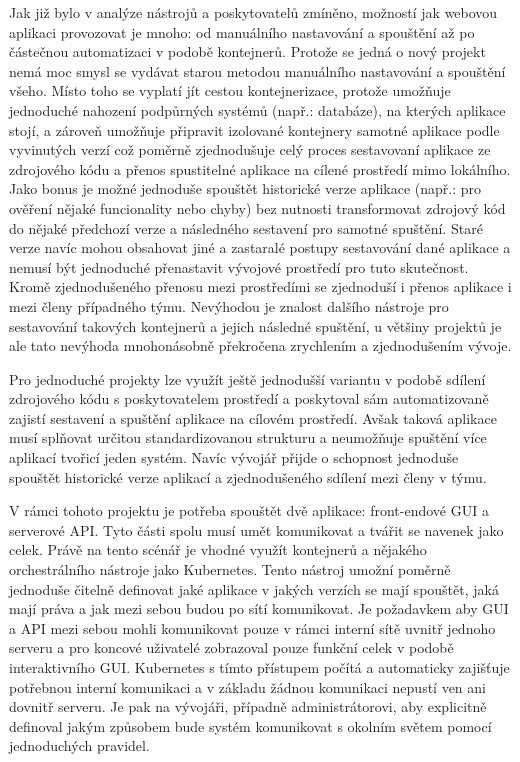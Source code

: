 			Jak již bylo v analýze nástrojů a poskytovatelů zmíněno, možností jak webovou aplikaci provozovat je mnoho: od
			manuálního nastavování a spouštění až po částečnou automatizaci v podobě kontejnerů.
			Protože se jedná o nový projekt nemá moc smysl se vydávat starou metodou manuálního nastavování a spouštění všeho.
			Místo toho se vyplatí jít cestou kontejnerizace, protože umožňuje jednoduché nahození podpůrných systémů
			(např.: databáze), na kterých aplikace stojí, a zároveň umožňuje připravit izolované kontejnery samotné aplikace
			podle vyvinutých verzí což poměrně zjednodušuje celý proces sestavovaní aplikace ze zdrojového kódu a přenos
			spustitelné aplikace na cílené prostředí mimo lokálního.
			Jako bonus je možné jednoduše spouštět historické verze aplikace (např.: pro ověření nějaké funcionality nebo chyby)
			bez nutnosti transformovat zdrojový kód do nějaké
			předchozí verze a následného sestavení pro samotné spuštění.
			Staré verze navíc mohou obsahovat jiné a zastaralé postupy sestavování dané aplikace a nemusí být jednoduché
			přenastavit vývojové prostředí pro tuto skutečnost.
			Kromě zjednodušeného přenosu mezi prostředími se zjednoduší i přenos aplikace i mezi členy případného týmu.
			Nevýhodou je znalost dalšího nástroje pro sestavování takových kontejnerů a jejich následné spuštění, u většiny
			projektů je ale tato nevýhoda mnohonásobně překročena zrychlením a zjednodušením vývoje.

			Pro jednoduché projekty lze využít ještě jednodušší variantu v podobě sdílení zdrojového kódu s poskytovatelem
			prostředí a poskytoval sám automatizovaně zajistí sestavení a spuštění aplikace na cílovém prostředí.
			Avšak taková aplikace musí splňovat určitou standardizovanou strukturu a neumožňuje spuštění více aplikací tvořicí
			jeden systém.
			Navíc vývojář přijde o schopnost jednoduše spouštět historické verze aplikací a zjednodušeného sdílení mezi členy
			v týmu.

			V rámci tohoto projektu je potřeba spouštět dvě aplikace: front-endové \ac{GUI} a serverové \ac{API}.
			Tyto části spolu musí umět komunikovat a tvářit se navenek jako celek.
			Právě na tento scénář je vhodné využít kontejnerů a nějakého orchestrálního nástroje jako Kubernetes.
			Tento nástroj umožní poměrně jednoduše čitelně definovat jaké aplikace v jakých verzích se mají spouštět, jaká mají
			práva a jak mezi sebou budou po sítí komunikovat.
			Je požadavkem aby \ac{GUI} a \ac{API} mezi sebou mohli komunikovat pouze v rámci interní sítě uvnitř jednoho serveru
			a pro koncové uživatelé zobrazoval pouze funkční celek v podobě interaktivního \ac{GUI}.
			Kubernetes s tímto přístupem počítá a automaticky zajišťuje potřebnou interní komunikaci a v základu žádnou komunikaci
			nepustí ven ani dovnitř serveru.
			Je pak na vývojáři, případně administrátorovi, aby explicitně definoval jakým způsobem bude systém komunikovat s
			okolním světem pomocí jednoduchých pravidel.

